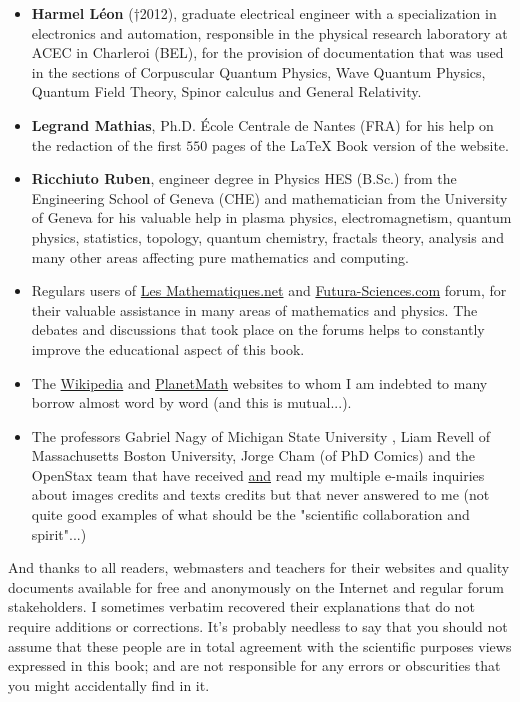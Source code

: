\documentclass[12pt,a4paper,twoside,openright]{report}
\theoremstyle{definition}
\theoremstyle{itexmp}
\numberwithin{equation}{section}
\begin{document}
	\begin{itemize}		
		\item \textbf{Harmel Léon }(†2012), graduate electrical engineer with a specialization in electronics and automation, responsible in the physical research laboratory at ACEC in Charleroi (BEL), for the provision of documentation that was used in the sections of Corpuscular Quantum Physics, Wave Quantum Physics,  Quantum Field Theory, Spinor calculus and General Relativity.
		
		\item \textbf{Legrand Mathias}, Ph.D. École Centrale de Nantes (FRA) for his help on the redaction of the first $550$ pages of the \LaTeX{} Book version of the website.
		
		\item \textbf{Ricchiuto Ruben}, engineer degree in Physics HES (B.Sc.) from the Engineering School of Geneva (CHE) and mathematician from the University of Geneva for his valuable help in plasma physics, electromagnetism, quantum physics, statistics, topology, quantum chemistry, fractals theory, analysis and many other areas affecting pure mathematics and computing.
		
		\item Regulars users of \href{http://www.les-mathematiques.net}{{\color{blue} Les Mathematiques.net}} and \href{http://www.futura-sciences.com}{{\color{blue} Futura-Sciences.com}} forum, for their valuable assistance in many areas of mathematics and physics. The debates and discussions that took place on the forums helps to constantly improve the educational aspect of this book.
		
		\item The \href{http://www.wikipedia.com}{{\color{blue} Wikipedia}} and \href{http://www.planetmath.com}{{\color{blue} PlanetMath}} websites to whom I am indebted to many borrow almost word by word (and this is mutual...).
		
		\item The professors Gabriel Nagy of Michigan State University , Liam Revell of Massachusetts Boston University, Jorge Cham (of PhD Comics) and the OpenStax team that have received \underline{and} read my multiple e-mails inquiries about images credits and texts credits but that never answered to me (not quite good examples of what should be the "scientific collaboration and spirit"...)
	\end{itemize}
	
	And thanks to all readers, webmasters and teachers for their websites and quality documents available for free and anonymously on the Internet and regular forum stakeholders. I sometimes verbatim recovered their explanations that do not require additions or corrections. It's probably needless to say that you should not assume that these people are in total agreement with the scientific purposes views expressed in this book; and are not responsible for any errors or obscurities that you might accidentally find in it.
	
\end{document}

